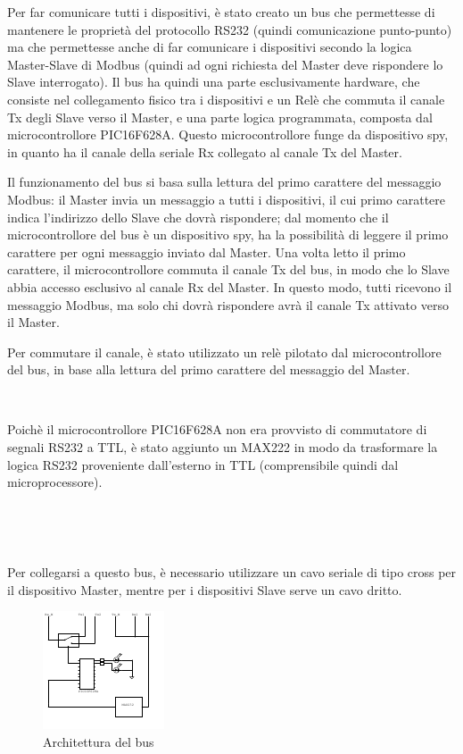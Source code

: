 \documentclass[a4paper,titlepage]{book}
\begin{document}
Per far comunicare tutti i dispositivi, è stato creato un bus che permettesse di mantenere le proprietà del protocollo RS232 (quindi comunicazione punto-punto) ma che permettesse anche di far comunicare i dispositivi secondo la logica Master-Slave di Modbus (quindi ad ogni richiesta del Master deve rispondere lo Slave interrogato). Il bus ha quindi una parte esclusivamente hardware, che consiste nel collegamento fisico tra i dispositivi e un Relè che commuta il canale Tx degli Slave verso il Master, e una parte logica programmata, composta dal microcontrollore PIC16F628A. Questo microcontrollore funge da dispositivo spy, in quanto ha il canale della seriale Rx collegato al canale Tx del Master.

Il funzionamento del bus si basa sulla lettura del primo carattere del messaggio Modbus: il Master invia un messaggio a tutti i dispositivi, il cui primo carattere indica l'indirizzo dello Slave che dovrà rispondere; dal momento che il microcontrollore del bus è un dispositivo spy, ha la possibilità di leggere il primo carattere per ogni messaggio inviato dal Master. Una volta letto il primo carattere, il microcontrollore commuta il canale Tx del bus, in modo che lo Slave abbia accesso esclusivo al canale Rx del Master. In questo modo, tutti ricevono il messaggio Modbus, ma solo chi dovrà rispondere avrà il canale Tx attivato verso il Master.

Per commutare il canale, è stato utilizzato un relè pilotato dal microcontrollore del bus, in base alla lettura del primo carattere del messaggio del Master.

~

Poichè il microcontrollore PIC16F628A non era provvisto di commutatore di segnali RS232 a TTL, è stato aggiunto un MAX222 in modo da trasformare la logica RS232 proveniente dall'esterno in TTL (comprensibile quindi dal microprocessore).

~

~

Per collegarsi a questo bus, è necessario utilizzare un cavo seriale di tipo cross per il dispositivo Master, mentre per i dispositivi Slave serve un cavo dritto.


\begin{figure}[!ht]
\centering
\includegraphics[scale=4.5]{bus.pdf}
\caption{Architettura del bus}
\end{figure}
\end{document}
